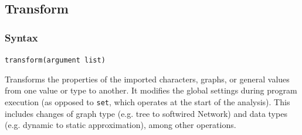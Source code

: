 \subsection{Transform}
\label{subsec:transform}
	\subsubsection{Syntax}
		\texttt{transform(argument list)}
			
	\begin{phygdescription}
		{Transforms the properties of the imported characters, graphs, or general values 
		from one value or type to another. It 
		modifies the global settings during program execution (as opposed to \texttt{set}, 
		which operates at the start of the analysis). This includes changes of graph type
		(e.g. tree to softwired Network) and data types (e.g. dynamic to static 
		approximation), among other operations.}
	\end{phygdescription}
			
